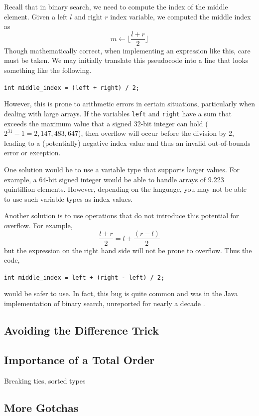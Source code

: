 Recall that in binary search, we need to compute the index of the middle element.
Given a left $l$ and right $r$ index variable, we computed the middle index
as 
  $$m \leftarrow \lfloor \frac{l + r}{2} \rfloor$$
Though mathematically correct, when implementing an expression like this, 
care must be taken.  We may initially translate this pseudocode into a line
that looks something like the following.
  
\texttt{int middle_index = (left + right) / 2;}

However, this is prone to arithmetic errors in certain situations, particularly
when dealing with large arrays.  If the variables \texttt{left} 
and \texttt{right} have a sum that exceeds the maximum value that 
a signed 32-bit integer can hold ($2^31 - 1 = 2,147,483,647$), then 
overflow will occur before the division by 2, leading to a (potentially) 
negative index value and thus an invalid out-of-bounds error or exception.

One solution would be to use a variable type that supports larger
values.  For example, a 64-bit signed integer would be able to handle
arrays of 9.223 quintillion elements.  However, depending on the language, 
you may not be able to use such variable types as index values.

Another solution is to use operations that do not introduce this 
potential for overflow.  For example, 
  $$\frac{l + r}{2} = l + \frac{(r - l)}{2}$$
but the expression on the right hand side will not be prone to overflow.  
Thus the code,

\texttt{int middle_index = left + (right - left) / 2;}

would be safer to use.  In fact, this bug is quite common 
\cite{Pattis:1988:TEB:52964.53012} and was in the Java implementation
of binary search, unreported for nearly a decade \cite{Bloch2006}.

\subsection{Avoiding the Difference Trick}

\subsection{Importance of a Total Order}

Breaking ties, sorted types

\subsection{More Gotchas}

